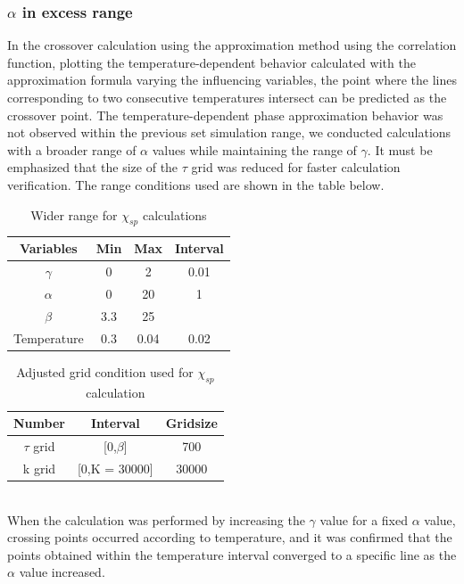 \documentclass{article}[12pt]
\numberwithin{equation}{section}
\begin{document}
\begin{spacing}{1.5}
\subsubsection*{$\alpha$ in excess range}
In the crossover calculation using the approximation method using the correlation function, 
plotting the temperature-dependent behavior calculated with the approximation formula varying the influencing variables, 
the point where the lines corresponding to two consecutive temperatures intersect can be predicted as the crossover point.
The temperature-dependent phase approximation behavior was not observed within the previous set simulation range, 
we conducted calculations with a broader range of $\alpha$ values while maintaining the range of $\gamma$. 
It must be emphasized that the size of the $\tau$ grid was reduced for faster calculation verification. 
The range conditions used are shown in the table below.
\begin{table}[htbp]
  \centering
  \renewcommand{\arraystretch}{1.2}  %
  \begin{tabular}{@{}cccc@{}}
  \toprule
  \textbf{Variables} & \textbf{Min} & \textbf{Max}  & \textbf{Interval}\\ 
  \midrule
  $\gamma$ & 0 & 2 & 0.01 \\
  $\alpha$ & 0 & 20 & 1 \\
  $\beta$ & 3.3 & 25 &  \\
  Temperature & 0.3 & 0.04 & 0.02 \\
  \bottomrule
  \end{tabular}
  \caption{Wider range for $\chi_{sp}$ calculations}
  \end{table}
\begin{table}[htbp]
  \centering
  \renewcommand{\arraystretch}{1.2}  %
  \begin{tabular}{@{}ccc@{}}
  \toprule
  \textbf{Number} & \textbf{Interval} & \textbf{Gridsize}\\ 
  \midrule
  $\tau$ grid & [0,$\beta$] & 700 \\
  k grid & [0,K = 30000] & 30000 \\
  \bottomrule
  \end{tabular}
  \caption{Adjusted grid condition used for $\chi_{sp}$ calculation}
  \end{table}
\\
When the calculation was performed by increasing the $\gamma$ value for a fixed $\alpha$ value, crossing points occurred according to temperature, 
and it was confirmed that the points obtained within the temperature interval converged to a specific line as the $\alpha$ value increased. 

\end{spacing}
\end{document}
